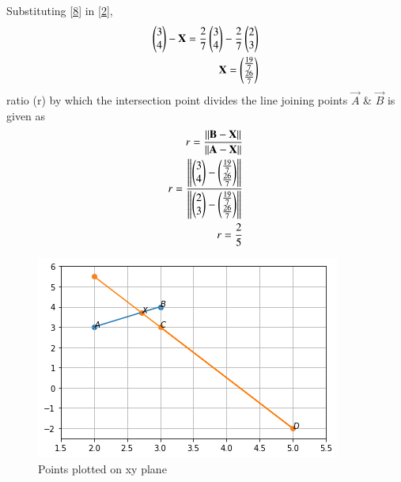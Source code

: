 \documentclass[journal,12pt,twocolumn]{IEEEtran}
\begin{document}
Substituting \eqref{8} in \eqref{2},
\begin{align}
\begin{pmatrix}3\\4\end{pmatrix} - \mathbf{X} = \frac{2}{7}\begin{pmatrix}3\\4\end{pmatrix} -\frac{2}{7}\begin{pmatrix}2\\3\end{pmatrix} \label{9} \\
\mathbf{X} = \begin{pmatrix}\frac{19}{7}\\\frac{26}{7}\end{pmatrix} \label{10} 
\end{align}
ratio (r) by which the intersection point divides the line joining points $\vec{A}$ \& $\vec{B}$ is given as
\begin{align}
r = \frac{\left\lVert\mathbf{B} -\mathbf{X}\right\rVert}{\left\lVert\mathbf{A} -\mathbf{X}\right\rVert} \label{11}\\
r = \frac{\left\lVert\begin{pmatrix}3\\4\end{pmatrix} -\begin{pmatrix}\frac{19}{7}\\ \frac{26}{7}\end{pmatrix}\right\rVert}{\left\lVert\begin{pmatrix}2\\3\end{pmatrix} -\begin{pmatrix}\frac{19}{7}\\\frac{26}{7}\end{pmatrix}\right\rVert} \label{12} \\  
r = \frac{2}{5} \label{13}   
\end{align}
\begin{figure}[!ht]
	\centering
	\includegraphics[width=\columnwidth]{fig1.png}
	\caption{Points plotted on xy plane}
	\end{figure}
\end{document}
